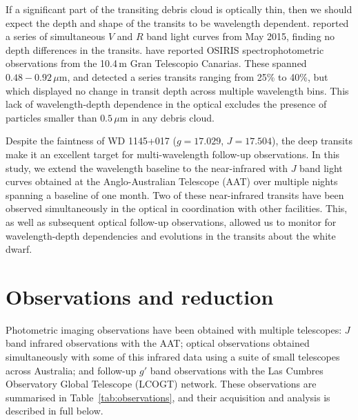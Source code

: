 \documentclass[apj]{emulateapj}
\begin{document}
If a significant part of the transiting debris cloud is optically thin, then we should expect the depth and shape of the transits to be wavelength dependent. \citet{2015arXiv151006434C} reported a series of simultaneous $V$ and $R$ band light curves from May 2015, finding no depth differences in the transits. \citet{2016arXiv160308823A} have reported OSIRIS spectrophotometric observations from the 10.4\,m Gran Telescopio Canarias. These spanned $0.48-0.92\,\mu\mathrm{m}$, and detected a series transits ranging from 25\% to 40\%, but which displayed no change in transit depth across multiple wavelength bins. This lack of wavelength-depth dependence in the optical excludes the presence of particles smaller than $ 0.5\,\mu \mathrm{m}$ in any debris cloud. 

Despite the faintness of WD 1145+017 ($g=17.029$, $J=17.504$), the deep transits make it an excellent target for multi-wavelength follow-up observations. In this study, we extend the wavelength baseline to the near-infrared with $J$ band light curves obtained at the Anglo-Australian Telescope (AAT) over multiple nights spanning a baseline of one month. Two of these near-infrared transits have been observed simultaneously in the optical in coordination with other facilities. This, as well as subsequent optical follow-up observations, allowed us to monitor for wavelength-depth dependencies and evolutions in the transits about the white dwarf.

\section{Observations and reduction}
\label{sec:observations}

Photometric imaging observations have been obtained with multiple telescopes: $J$ band infrared observations with the AAT; optical observations 
obtained simultaneously with some of this infrared data using a suite of small telescopes across Australia; and follow-up $g'$ band observations with the Las Cumbres Observatory Global Telescope (LCOGT) network. These observations are summarised in Table~\ref{tab:observations}, and their acquisition and analysis is described in full below.
\end{document}
